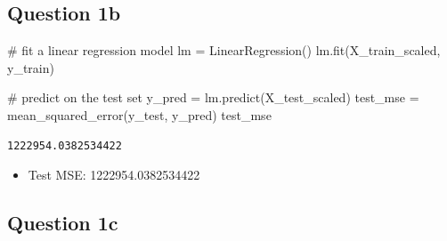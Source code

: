 \documentclass[
  letterpaper,
  DIV=11,
  numbers=noendperiod]{scrartcl}
\newenvironment{Shaded}{\begin{snugshade}}{\end{snugshade}}
\newcommand{\CommentTok}[1]{\textcolor[rgb]{0.37,0.37,0.37}{#1}}
\newcommand{\NormalTok}[1]{\textcolor[rgb]{0.00,0.23,0.31}{#1}}
\newcommand{\OperatorTok}[1]{\textcolor[rgb]{0.37,0.37,0.37}{#1}}
\providecommand{\tightlist}{%
  \setlength{\itemsep}{0pt}\setlength{\parskip}{0pt}}\usepackage{longtable,booktabs,array}
\begin{document}
\subsection{Question 1b}\label{question-1b}

\begin{Shaded}
\begin{Highlighting}[]
\CommentTok{\# fit a linear regression model}
\NormalTok{lm }\OperatorTok{=}\NormalTok{ LinearRegression()}
\NormalTok{lm.fit(X\_train\_scaled, y\_train)}

\CommentTok{\# predict on the test set}
\NormalTok{y\_pred }\OperatorTok{=}\NormalTok{ lm.predict(X\_test\_scaled)}
\NormalTok{test\_mse }\OperatorTok{=}\NormalTok{ mean\_squared\_error(y\_test, y\_pred)}
\NormalTok{test\_mse}
\end{Highlighting}
\end{Shaded}

\begin{verbatim}
1222954.0382534422
\end{verbatim}

\begin{itemize}
\tightlist
\item
  Test MSE: 1222954.0382534422
\end{itemize}

\subsection{Question 1c}\label{question-1c}
\end{document}
